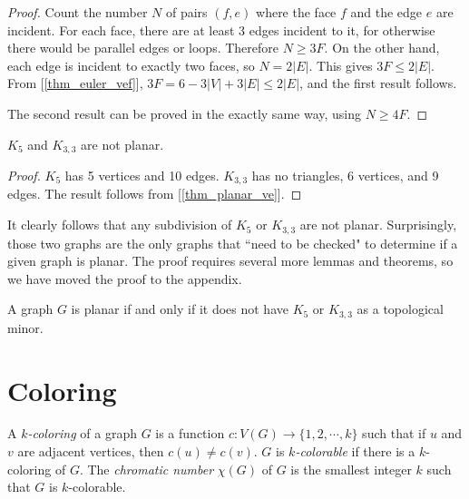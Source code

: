         \begin{proof}
            Count the number $N$ of pairs $(f, e)$ where the face $f$ and the edge $e$ are incident. For each face, there are at least 3 edges incident to it, for otherwise there would be parallel edges or loops. Therefore $N \geq 3F$. On the other hand, each edge is incident to exactly two faces, so $N = 2|E|$. This gives $3F \leq 2|E|$. From [\ref{thm_euler_vef}], $3F = 6-3|V|+3|E| \leq 2|E|$, and the first result follows.
            
            The second result can be proved in the exactly same way, using $N \geq 4F$.
        \end{proof}
        
        \begin{coro} \label{cor_k5_k33}
            $K_5$ and $K_{3,3}$ are not planar.
        \end{coro}
        
        \begin{proof}
            $K_5$ has 5 vertices and 10 edges. $K_{3,3}$ has no triangles, 6 vertices, and 9 edges. The result follows from [\ref{thm_planar_ve}].
        \end{proof}
        
        It clearly follows that any subdivision of $K_5$ or $K_{3,3}$ are not planar. Surprisingly, those two graphs are the only graphs that ``need to be checked" to determine if a given graph is planar. The proof requires several more lemmas and theorems, so we have moved the proof to the appendix.
        
        \begin{thm} \label{thm_kuratowski}
            A graph $G$ is planar if and only if it does not have $K_5$ or $K_{3,3}$ as a topological minor.
        \end{thm}
    
    \section{Coloring}
        \begin{defn}[Coloring] \label{def_coloring}
            A \emph{$k$-coloring} of a graph $G$ is a function $c: V(G) \to \{1,2,\cdots,k\}$ such that if $u$ and $v$ are adjacent vertices, then $c(u) \neq c(v)$. $G$ is \emph{$k$-colorable} if there is a $k$-coloring of $G$. The \emph{chromatic number} $\chi(G)$ of $G$ is the smallest integer $k$ such that $G$ is $k$-colorable.
        \end{defn}
        
